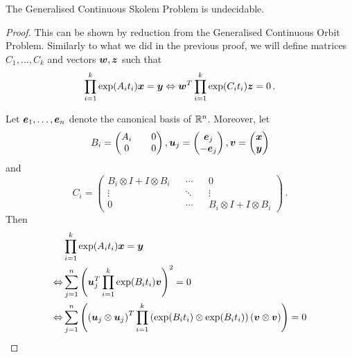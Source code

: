 \begin{theorem}
The Generalised Continuous Skolem Problem is undecidable.
\end{theorem}

\begin{proof}
This can be shown by reduction from the Generalised Continuous Orbit Problem.
Similarly to what we did in the previous proof, we will define matrices $C_{1}, \ldots, C_{k}$ and vectors $\boldsymbol{w}, \boldsymbol{z}$ such that
\begin{equation*}
\prod \limits_{i=1}^{k} \exp(A_{i} t_{i}) \boldsymbol{x} = \boldsymbol{y}
\Leftrightarrow
\boldsymbol{w}^{T} \prod\limits_{i=1}^{k} \exp(C_{i} t_{i}) \boldsymbol{z} = 0 \, .
\end{equation*}

Let $\boldsymbol{e}_{1}, \ldots, \boldsymbol{e}_{n}$ denote the canonical basis of $\mathbb{R}^{n}$. Moreover, let
\begin{equation*}
B_{i} = \begin{pmatrix} A_{i} && 0 \\ 0 && 0 \end{pmatrix},
\boldsymbol{u}_{j} = \begin{pmatrix} \boldsymbol{e}_{j} \\ - \boldsymbol{e}_{j} \end{pmatrix},
\boldsymbol{v} = \begin{pmatrix} \boldsymbol{x} \\ \boldsymbol{y} \end{pmatrix}
\end{equation*}
and
\begin{equation*}
C_{i} = \begin{pmatrix} B_{i} \otimes I + I \otimes B_{i} && \cdots && 0 \\ \vdots && \ddots && \vdots \\ 0 && \cdots && B_{i} \otimes I + I \otimes B_{i} \end{pmatrix} \, .
\end{equation*}
Then
\begin{align*}
&\prod \limits_{i=1}^{k} \exp(A_{i} t_{i}) \myvector{x} = \myvector{y} \\
\Leftrightarrow &\sum \limits_{j=1}^{n} \left( \myvector{u}_{j}^{T} \prod \limits_{i=1}^{k} \exp(B_{i} t_{i}) \myvector{v} \right)^{2} = 0 \\
\Leftrightarrow &\sum \limits_{j=1}^{n} \left( \left( \myvector{u}_{j} \otimes \myvector{u}_{j} \right)^{T} \prod \limits_{i=1}^{k} \left( \exp( B_{i} t_{i} ) \otimes \exp(B_{i} t_{i}) \right) \left( \myvector{v} \otimes \myvector{v} \right) \right) = 0 \\

\end{align*}
\end{proof}
